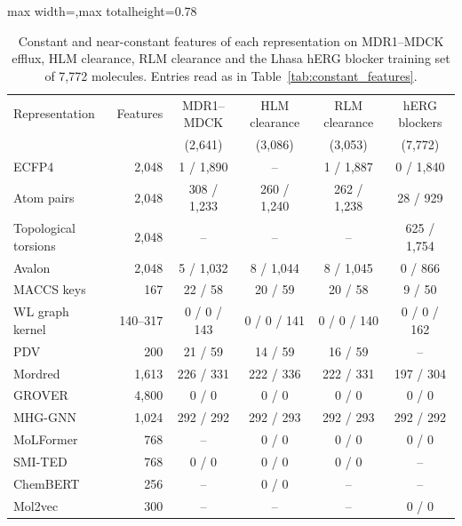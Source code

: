 \begin{table}[htbp]
\centering
\small
\setlength{\tabcolsep}{4pt}
\begin{adjustbox}{max width=\textwidth,max totalheight=0.78\textheight}
\begin{tabular}{lrcccc}
\toprule
Representation & Features & MDR1--MDCK & HLM clearance & RLM clearance & hERG blockers \\
 & & (2,641) & (3,086) & (3,053) & (7,772) \\
\midrule
ECFP4 & 2,048 & 1 / 1,890 & -- & 1 / 1,887 & 0 / 1,840 \\
Atom pairs & 2,048 & 308 / 1,233 & 260 / 1,240 & 262 / 1,238 & 28 / 929 \\
Topological torsions & 2,048 & -- & -- & -- & 625 / 1,754 \\
Avalon & 2,048 & 5 / 1,032 & 8 / 1,044 & 8 / 1,045 & 0 / 866 \\
MACCS keys & 167 & 22 / 58 & 20 / 59 & 20 / 58 & 9 / 50 \\
WL graph kernel & 140--317 & 0 / 0 / 143 & 0 / 0 / 141 & 0 / 0 / 140 & 0 / 0 / 162 \\
PDV & 200 & 21 / 59 & 14 / 59 & 16 / 59 & -- \\
Mordred & 1,613 & 226 / 331 & 222 / 336 & 222 / 331 & 197 / 304 \\
GROVER & 4,800 & 0 / 0 & 0 / 0 & 0 / 0 & 0 / 0 \\
MHG-GNN & 1,024 & 292 / 292 & 292 / 293 & 292 / 293 & 292 / 292 \\
MoLFormer & 768 & -- & 0 / 0 & 0 / 0 & 0 / 0 \\
SMI-TED & 768 & 0 / 0 & 0 / 0 & 0 / 0 & -- \\
ChemBERT & 256 & -- & 0 / 0 & -- & -- \\
Mol2vec & 300 & -- & -- & -- & 0 / 0 \\
\bottomrule
\end{tabular}
\end{adjustbox}
\caption[Constant and near-constant features per representation, part 2.]{Constant and near-constant features of each representation on MDR1--MDCK efflux, HLM clearance, RLM clearance and the Lhasa hERG blocker training set of 7,772 molecules. Entries read as in Table~\ref{tab:constant_features}.}
\label{tab:constant_features_b}
\end{table}

